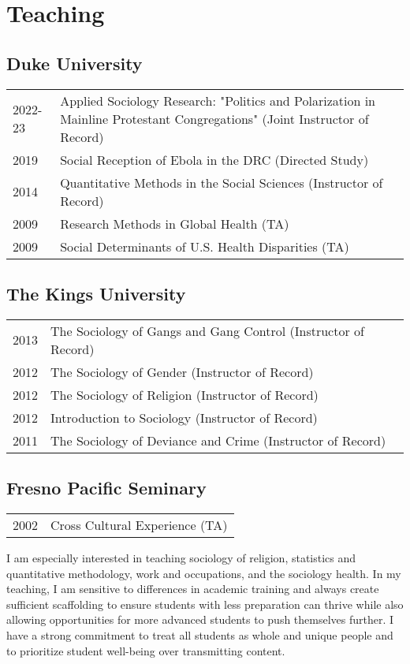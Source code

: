 \section*{Teaching}
\subsection*{Duke University}

\begin{tabular}{p{} p{}}
2022-23 & Applied Sociology Research: "Politics and Polarization in Mainline Protestant Congregations" (Joint Instructor of Record)\\
2019 & Social Reception of Ebola in the DRC (Directed Study) \\
2014 & Quantitative Methods in the Social Sciences (Instructor of Record)\\
2009 & Research Methods in Global Health (TA) \\
2009 & Social Determinants of U.S. Health Disparities (TA)\\
\end{tabular}

\subsection*{The Kings University}

\begin{tabular}{p{} p{}}
2013 & The Sociology of Gangs and Gang Control (Instructor of Record)\\
2012 & The Sociology of Gender (Instructor of Record)\\
2012 & The Sociology of Religion (Instructor of Record)\\
2012 & Introduction to Sociology (Instructor of Record)\\
2011 & The Sociology of Deviance and Crime (Instructor of Record)\\
\end{tabular}

\subsection*{Fresno Pacific Seminary}

\begin{tabular}{p{} p{}}
2002 & Cross Cultural Experience (TA) \\
\end{tabular}
\vspace{-1em}



I am especially interested in teaching sociology of religion, statistics and quantitative methodology, work and occupations, and the sociology health. In my teaching, I am sensitive to differences in academic training and always create sufficient scaffolding to ensure students with less preparation can thrive while also allowing opportunities for more advanced students to push themselves further. I have a strong commitment to treat all students as whole and unique people and to prioritize student well-being over transmitting content. 
